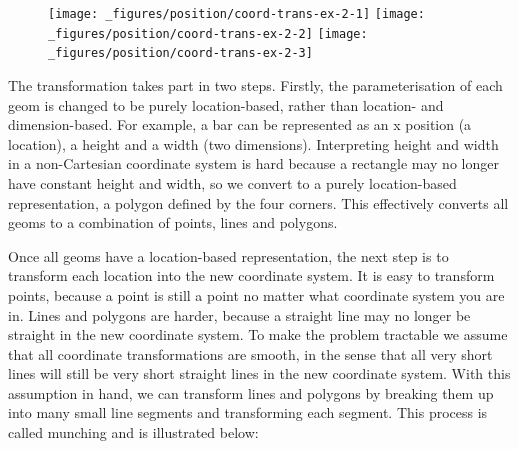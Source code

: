 \begin{Shaded}
\begin{Highlighting}[]
\OperatorTok{+}\StringTok{ }\NormalTok{()}
\OperatorTok{+}\StringTok{ }\NormalTok{(} \NormalTok{)}
\OperatorTok{+}\StringTok{ }\NormalTok{()}
\end{Highlighting}
\end{Shaded}

\begin{figure}[H]
  \texttt{[image: \_figures/position/coord-trans-ex-2-1]}%
  \texttt{[image: \_figures/position/coord-trans-ex-2-2]}%
  \texttt{[image: \_figures/position/coord-trans-ex-2-3]}
\end{figure}

The transformation takes part in two steps. Firstly, the
parameterisation of each geom is changed to be purely location-based,
rather than location- and dimension-based. For example, a bar can be
represented as an x position (a location), a height and a width (two
dimensions). Interpreting height and width in a non-Cartesian coordinate
system is hard because a rectangle may no longer have constant height
and width, so we convert to a purely location-based representation, a
polygon defined by the four corners. This effectively converts all geoms
to a combination of points, lines and polygons.
 

Once all geoms have a location-based representation, the next step is to
transform each location into the new coordinate system. It is easy to
transform points, because a point is still a point no matter what
coordinate system you are in. Lines and polygons are harder, because a
straight line may no longer be straight in the new coordinate system. To
make the problem tractable we assume that all coordinate transformations
are smooth, in the sense that all very short lines will still be very
short straight lines in the new coordinate system. With this assumption
in hand, we can transform lines and polygons by breaking them up into
many small line segments and transforming each segment. This process is
called munching and is illustrated below: 

